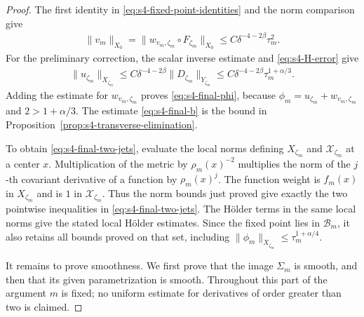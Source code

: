 \documentclass[a4paper,11pt,oneside,reqno]{amsart}
\numberwithin{equation}{section}
\theoremstyle{definition}
\begin{document}
\begin{proof}
    The first identity in \eqref{eq:s4-fixed-point-identities}
    and the norm comparison give
    \begin{align*}
        \|v_m\|_{X_0}
        =\|w_{v_m,\zeta_m}\circ F_{\zeta_m}\|_{X_0}
        \leq C\delta^{-4-2\beta}\tau_m^2.
    \end{align*}
    For the preliminary correction, the scalar inverse estimate
    and \eqref{eq:s4-H-error} give
    \begin{align*}
        \|u_{\zeta_m}\|_{X_{\zeta_m}}
        \leq C\delta^{-4-2\beta}\|D_{\zeta_m}\|_{Y_{\zeta_m}}
        \leq C\delta^{-4-2\beta}\tau_m^{1+\alpha/3}.
    \end{align*}
    Adding the estimate for $w_{v_m,\zeta_m}$ proves
    \eqref{eq:s4-final-phi}, because
    $\phi_m=u_{\zeta_m}+w_{v_m,\zeta_m}$ and
    $2>1+\alpha/3$.
    The estimate \eqref{eq:s4-final-b} is the bound in
    Proposition~\ref{prop:s4-transverse-elimination}.

    To obtain \eqref{eq:s4-final-two-jets}, evaluate the local
    norms defining $X_{\zeta_m}$ and
    $\mathcal X_{\zeta_m}$ at a center $x$.
    Multiplication of the metric by $\rho_m(x)^{-2}$ multiplies
    the norm of the $j$-th covariant derivative of a function
    by $\rho_m(x)^j$. The function weight is $f_m(x)$ in
    $X_{\zeta_m}$ and is $1$ in $\mathcal X_{\zeta_m}$.
    Thus the norm bounds just proved give exactly the two
    pointwise inequalities in \eqref{eq:s4-final-two-jets}.
    The H\"older terms in the same local norms give the stated
    local H\"older estimates. Since the fixed point lies in
    $\mathcal B_m$, it also retains all bounds proved on that
    set, including
    $\|\phi_m\|_{X_{\zeta_m}}\leq\tau_m^{1+\alpha/4}$.

    It remains to prove smoothness. We first prove that the image
    $\Sigma_m$ is smooth, and then that its given parametrization
    is smooth. Throughout this part of the argument $m$ is fixed;
    no uniform estimate for derivatives of order greater than two
    is claimed.


\end{proof}
\end{document}
